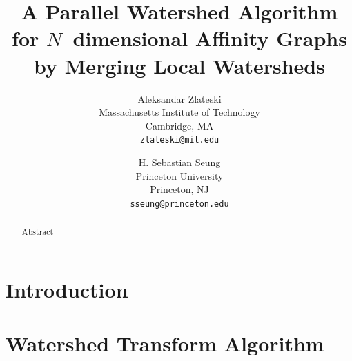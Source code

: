 \documentclass[10pt, conference, compsocconf]{IEEEtran}
\begin{document}

\title{A Parallel Watershed Algorithm for $N$--dimensional Affinity
  Graphs by Merging Local Watersheds}

\author{
Aleksandar Zlateski\\ Massachusetts Institute of Technology\\ Cambridge, MA\\
{\tt\small zlateski@mit.edu}
\and
H. Sebastian Seung\\ Princeton University\\ Princeton, NJ\\
{\tt\small sseung@princeton.edu}
}



\maketitle



\begin{abstract}
Abstract
\end{abstract}


\section{Introduction}


\section{Watershed Transform Algorithm}
\end{document}
